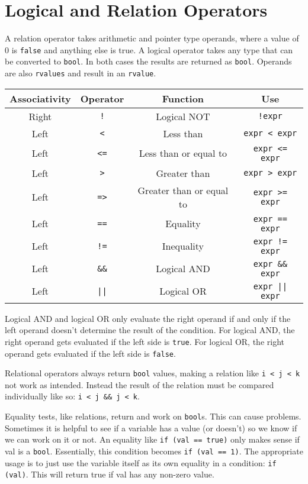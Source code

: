 \documentclass[12pt, a4paper]{report}
\begin{document}
\section{Logical and Relation Operators}
A relation operator takes arithmetic and pointer type operands, where a value of 0 is \verb|false| and anything else is true.
A logical operator takes any type that can be converted to \verb|bool|.
In both cases the results are returned as \verb|bool|.
Operands are also \verb|rvalues| and result in an \verb|rvalue|.
\begin{center}
  \begin{tabular}{ |c|c|c|c| }
    \hline
    \textbf{Associativity} & \textbf{Operator} & \textbf{Function} & \textbf{Use} \\
    \hline
    Right & \verb|!| & Logical NOT & \verb|!expr| \\
    \hline
    \hline
    Left & \verb|<| & Less than & \verb|expr < expr| \\
    \hline
    Left & \verb|<=| & Less than or equal to & \verb|expr <= expr| \\	
    \hline
    Left & \verb|>| & Greater than & \verb|expr > expr| \\
    \hline
    Left & \verb|=>| & Greater than or equal to  & \verb|expr >= expr| \\
    \hline
    \hline
    Left & \verb|==| & Equality & \verb|expr == expr| \\
    \hline
    Left & \verb|!=| & Inequality & \verb|expr != expr| \\
    \hline
    \hline
    Left & \verb|&&| & Logical AND & \verb|expr && expr| \\
    \hline
    \hline
    Left & \verb=||= & Logical OR & \verb=expr || expr= \\
    \hline
  \end{tabular}
\end{center}
Logical AND and logical OR only evaluate the right operand if and only if the left operand doesn't determine the result of the condition.
For logical AND, the right operand gets evaluated if the left side is \verb|true|.
For logical OR, the right operand gets evaluated if the left side is \verb|false|.

Relational operators always return \verb|bool| values, making a relation like \verb|i < j < k| not work as intended.
Instead the result of the relation must be compared individually like so: \verb|i < j && j < k|.

Equality tests, like relations, return and work on \verb|bool|s. 
This can cause problems.
Sometimes it is helpful to see if a variable has a value (or doesn't) so we know if we can work on it or not.
An equality like \verb|if (val == true)| only makes sense if val is a \verb|bool|.
Essentially, this condition becomes \verb|if (val == 1)|.
The appropriate usage is to just use the variable itself as its own equality in a condition:
\verb|if (val)|.
This will return true if val has any non-zero value.
\end{document}

